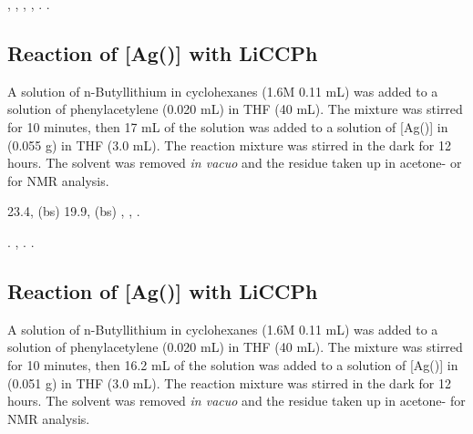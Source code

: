 \begin{sloppypar}
,
,
,
,
.
.
\end{sloppypar}

\subsection*{Reaction of \texorpdfstring{[Ag(\tButhixantphos)]} A with LiCCPh}

A solution of n-Butyllithium in cyclohexanes (1.6M 0.11 mL) was added to a solution of phenylacetylene (0.020 mL) in THF (40 mL).  The mixture was stirred for 10 minutes, then 17 mL of the solution was added to a solution of [Ag(\tButhixantphos)] in (0.055 g) in THF (3.0 mL).  The reaction mixture was stirred in the dark for 12 hours.  The solvent was removed \emph{in vacuo} and the residue taken up in acetone- or  for NMR analysis.   

\begin{sloppypar}
23.4, (bs)
19.9, (bs)
,
,
.
\end{sloppypar}

\begin{sloppypar}
.
,
.
.
\end{sloppypar}

\subsection*{Reaction of \texorpdfstring{[Ag(\tBuxantphos)]} A with LiCCPh}

A solution of n-Butyllithium in cyclohexanes (1.6M 0.11 mL) was added to a solution of phenylacetylene (0.020 mL) in THF (40 mL).  The mixture was stirred for 10 minutes, then 16.2 mL of the solution was added to a solution of [Ag(\tBuxantphos)] in (0.051 g) in THF (3.0 mL).  The reaction mixture was stirred in the dark for 12 hours.  The solvent was removed \emph{in vacuo} and the residue taken up in acetone- for NMR analysis.   

